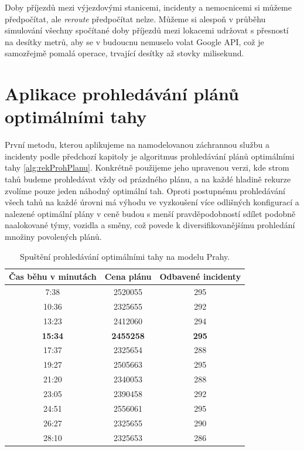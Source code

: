 Doby příjezdů mezi výjezdovými stanicemi, incidenty a nemocnicemi si můžeme předpočítat, ale \textit{reroute} předpočítat nelze.
Můžeme si alespoň v průběhu simulování všechny spočítané doby příjezdů mezi lokacemi udržovat s přesností na desítky metrů,
aby se v budoucnu nemuselo volat Google API, což je samozřejmě pomalá operace, trvající desítky až stovky milisekund. 

\section{Aplikace prohledávání plánů optimálními \linebreak tahy}

První metodu, kterou aplikujeme na namodelovanou záchrannou službu a incidenty podle předchozí kapitoly je algoritmus prohledávání plánů optimálními tahy \ref{alg:rekProhPlanu}.
Konkrétně použijeme jeho upravenou verzi, kde strom tahů budeme prohledávat vždy od prázdného plánu, a na každé hladině rekurze zvolíme pouze jeden náhodný optimální tah.
Oproti postupnému prohledávání všech tahů na každé úrovni má výhodu ve vyzkoušení více odlišných konfigurací a nalezené optimální plány v ceně budou s menší pravděpodobností sdílet
podobně naalokované týmy, vozidla a směny, což povede k diversifikovanějšímu prohledání množiny povolených plánů.

\begin{table}[h!]
  \centering
  \begin{tabular}{|c|c|c|}
    \hline
    \textbf{Čas běhu v minutách} & \textbf{Cena plánu} & \textbf{Odbavené incidenty} \\
    \hline
    7:38  & 2520055 & 295 \\
    \hline
    10:36 & 2325655 & 292 \\
    \hline
    13:23 & 2412060 & 294 \\
    \hline
    \textbf{15:34} & \textbf{2455258} & \textbf{295} \\
    \hline
    17:37 & 2325654 & 288 \\
    \hline
    19:27 & 2505663 & 295 \\
    \hline
    21:20 & 2340053 & 288 \\
    \hline
    23:05 & 2390458 & 292 \\
    \hline
    24:51 & 2556061 & 295 \\
    \hline
    26:27 & 2325655 & 290 \\
    \hline
    28:10 & 2325653 & 286 \\
    \hline
    \end{tabular}
  \caption{Spuštění prohledávání optimálními tahy na modelu Prahy.}
  \label{table:optimalMovesTabulka}
\end{table}

